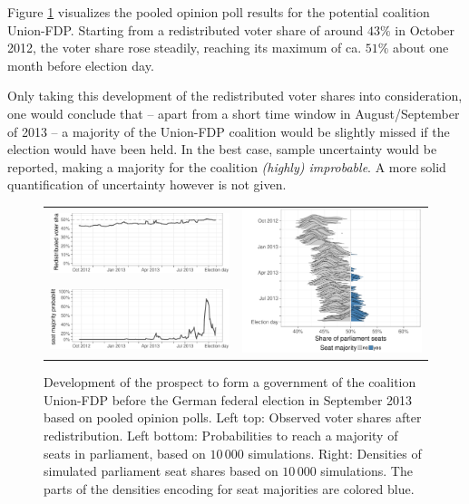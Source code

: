 \documentclass[smallcondensed]{svjour3}     %
\begin{document}
Figure \ref{fig:2013_cdufdp} visualizes the pooled opinion poll results
for the potential coalition Union-FDP.
Starting from a redistributed voter share of around $43\%$ in October 2012,
the voter share rose steadily, reaching its maximum
of ca. $51\%$ about one month before election day.

Only taking this development of the redistributed voter shares into
consideration, one would conclude that -- apart from a short
time window in August/September of 2013 -- a majority of the Union-FDP
coalition would be slightly missed if the election would have been held.
In the best case, sample uncertainty would be reported, making
a majority for the coalition {\it (highly) improbable}. A more
solid quantification of uncertainty however is not given.

\begin{figure}[H]\centering
\begin{tabular}{ll}
\includegraphics[height=.15\textwidth]{figures/2013_pooled_cdufdp_rawSharesRedist.pdf}
&
\multirow{2}{*}[13ex]{\includegraphics[height=.3\textwidth]{figures/2013_pooled_cdufdp_ridgeline.pdf}}
\\
\includegraphics[height=.15\textwidth]{figures/2013_pooled_cdufdp_prob.pdf}
\end{tabular}
\caption{Development of the prospect to form a government of the coalition Union-FDP before the German federal election in September 2013 based on pooled opinion polls.
Left top: Observed voter shares after redistribution. Left bottom: Probabilities to reach a majority of seats in parliament, based on $10\,000$ simulations. Right: Densities of simulated parliament seat shares based on $10\,000$ simulations. The parts of the densities encoding for seat majorities are colored blue.
\label{fig:2013_cdufdp}
}
\end{figure}
\end{document}

